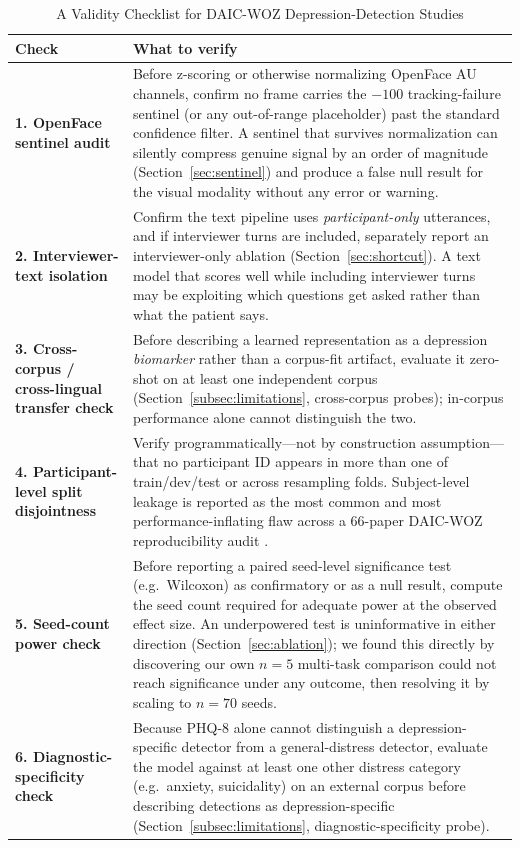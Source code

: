 \documentclass[5p,twocolumn]{elsarticle}
\begin{document}
\begin{table}[t]
\centering
\renewcommand{\arraystretch}{1.3}
\caption{A Validity Checklist for DAIC-WOZ Depression-Detection Studies}
\label{tab:checklist}
\begin{tabular}{p{}p{}}
\toprule
\textbf{Check} & \textbf{What to verify} \\
\midrule
\textbf{1. OpenFace sentinel audit} &
Before z-scoring or otherwise normalizing OpenFace AU channels, confirm
no frame carries the $-100$ tracking-failure sentinel (or any
out-of-range placeholder) past the standard confidence filter. A
sentinel that survives normalization can silently compress genuine
signal by an order of magnitude (Section~\ref{sec:sentinel}) and
produce a false null result for the visual modality without any
error or warning. \\[2pt]
\textbf{2. Interviewer-text isolation} &
Confirm the text pipeline uses \emph{participant-only} utterances, and
if interviewer turns are included, separately report an
interviewer-only ablation (Section~\ref{sec:shortcut}). A text model
that scores well while including interviewer turns may be exploiting
which questions get asked rather than what the patient says. \\[2pt]
\textbf{3. Cross-corpus / cross-lingual transfer check} &
Before describing a learned representation as a depression
\emph{biomarker} rather than a corpus-fit artifact, evaluate it
zero-shot on at least one independent corpus
(Section~\ref{subsec:limitations}, cross-corpus probes); in-corpus
performance alone cannot distinguish the two. \\[2pt]
\textbf{4. Participant-level split disjointness} &
Verify programmatically---not by construction assumption---that no
participant ID appears in more than one of train/dev/test or across
resampling folds. Subject-level leakage is reported as the most
common and most performance-inflating flaw across a 66-paper
DAIC-WOZ reproducibility audit \cite{danylenko2026}. \\[2pt]
\textbf{5. Seed-count power check} &
Before reporting a paired seed-level significance test (e.g.\
Wilcoxon) as confirmatory or as a null result, compute the seed count
required for adequate power at the observed effect size. An
underpowered test is uninformative in either direction
(Section~\ref{sec:ablation}); we found this directly by discovering our own
$n{=}5$ multi-task comparison could not reach significance under any
outcome, then resolving it by scaling to $n{=}70$ seeds. \\[2pt]
\textbf{6. Diagnostic-specificity check} &
Because PHQ-8 alone cannot distinguish a depression-specific detector
from a general-distress detector, evaluate the model against at least
one other distress category (e.g.\ anxiety, suicidality) on an
external corpus before describing detections as depression-specific
(Section~\ref{subsec:limitations}, diagnostic-specificity probe). \\
\bottomrule
\end{tabular}
\end{table}
\end{document}
